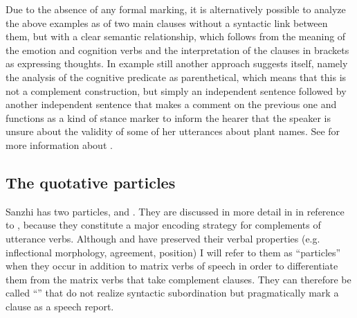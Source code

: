Due to the absence of any formal marking, it is alternatively possible to analyze the above examples as  of two main clauses without a syntactic link between them, but with a clear semantic relationship, which follows from the meaning of the emotion and cognition verbs and the interpretation of the clauses in brackets as expressing thoughts. In example  still another approach suggests itself, namely the analysis of the cognitive predicate as parenthetical, which means that this is not a complement construction, but simply an independent sentence followed by another independent sentence that makes a comment on the previous one and functions as a kind of stance marker to inform the hearer that the speaker is unsure about the validity of some of her utterances about plant names. See  for more information about .




\subsection{The quotative particles}
\label{ssec:The quotative particles}

Sanzhi has two  particles,  and . They are discussed in more detail in  in reference to , because they constitute a major encoding strategy for complements of utterance verbs. Although  and  have preserved their verbal properties (e.g. inflectional morphology,  agreement, position) I will refer to them as ``particles'' when they occur in addition to matrix verbs of speech in order to differentiate them from the matrix verbs that take complement clauses. They can therefore be called ``'' that do not realize syntactic subordination but pragmatically mark a clause as a speech report.

